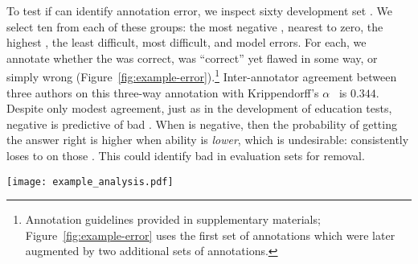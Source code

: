 To test if \irt{} can identify annotation error, we inspect sixty \squad{} development set \itms{}.
We select ten \itms{} from each of these groups: the most negative \discability{}, \discability{} nearest to zero, the highest \discability{}, the least difficult, most difficult, and \irt{} model errors.
For each, we annotate whether the \itm{} was correct, was ``correct'' yet flawed in some way, or simply wrong (Figure~\ref{fig:example-error}).\footnote{
    Annotation guidelines provided in supplementary materials; Figure~\ref{fig:example-error} uses the first set of annotations which were later augmented by two additional sets of annotations.
}
Inter-annotator agreement between three authors on this three-way annotation with Krippendorff's $\alpha$~\citep{kripp2004,artstein2008inter} is $0.344$.
Despite only modest agreement, just as in the development of education tests, negative \discability{} is predictive of bad \itms{}.
When \discability{} is negative, then the probability of getting
the answer right is higher when ability is \emph{lower}, which is
undesirable: \smart{} consistently loses to \dumb{} on those \itms{}.
This could identify bad \itms{} in evaluation sets for removal.
\begin{figure*}[t]
    \centering
    \texttt{[image: example\_analysis.pdf]}
    \caption{
        We annotate \squad{} \itms{} by \discability{}, \diff{}, and \irt{} prediction errors.
        For example, one question with negative \discability{} was classified as ``Wrong'' with the explanation that the annotated answer indicates it is  answerable, but the question actually  answerable.
        \Itms{} with negative \discability{} or where \irt{}'s prediction is wrong have a much higher rate of annotation error (``Flawed'' or ``Wrong'').
        Using similar methodology, errors in datasets could be more rapidly identified.
    }
    \label{fig:example-error}
\end{figure*}
